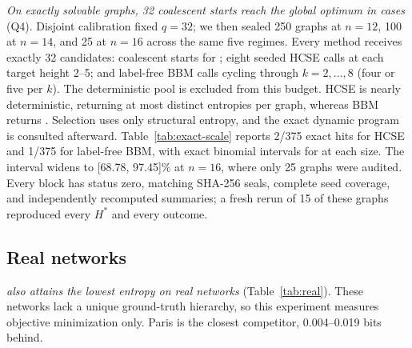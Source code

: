 \emph{On exactly solvable graphs, 32 coalescent starts reach the global optimum
in \ScaleCombinedExact{} cases} (Q4). Disjoint calibration fixed $q=32$; we
then sealed 250 graphs at $n=12$, 100 at $n=14$, and 25 at $n=16$ across the
same five regimes. Every method receives exactly 32 candidates: coalescent
starts for \NEST; eight seeded HCSE calls at each target height 2--5; and
label-free BBM calls cycling through $k=2,\dots,8$ (four or five per $k$). The
deterministic \NEST pool is excluded from this budget. HCSE is nearly
deterministic, returning at most \HCSEMaxDistinct{} distinct entropies per
graph, whereas BBM returns \BBMDistinctRange{}. Selection uses only structural entropy, and the
exact dynamic program is consulted afterward. Table~\ref{tab:exact-scale}
reports 2/375 exact hits for HCSE and 1/375 for label-free BBM, with exact
binomial intervals for \NEST at each size. The interval widens to
[68.78, 97.45]\% at $n=16$, where only 25 graphs were audited. Every block has
status zero, matching SHA-256 seals, complete seed coverage, and independently
recomputed summaries; a fresh rerun of 15 of these graphs reproduced every
$H^*$ and every \NEST outcome.



\subsection{Real networks}
\emph{{\upshape\NEST} also attains the lowest entropy on \RealWins{} real networks}
(Table~\ref{tab:real}). These networks lack a unique ground-truth hierarchy,
so this experiment measures objective minimization only. Paris is the closest
competitor, 0.004--0.019 bits behind.


